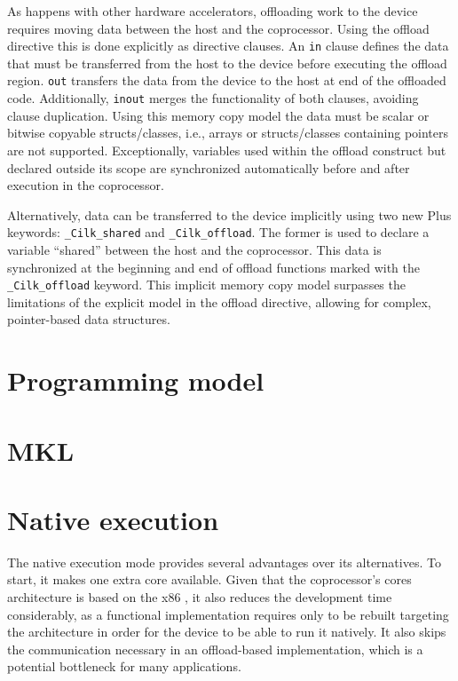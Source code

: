 \documentclass[../thesis]{subfiles}
\begin{document}
	As happens with other hardware accelerators, offloading work to the device requires moving data between the host and the coprocessor. Using the offload directive this is done explicitly as directive clauses. An \texttt{in} clause defines the data that must be transferred from the host to the device before executing the offload region. \texttt{out} transfers the data from the device to the host at end of the offloaded code. Additionally, \texttt{inout} merges the functionality of both clauses, avoiding clause duplication. Using this memory copy model the data must be scalar or bitwise copyable structs/classes, i.e., arrays or structs/classes containing pointers are not supported. Exceptionally, variables used within the offload construct but declared outside its scope are synchronized automatically before and after execution in the coprocessor.

	Alternatively, data can be transferred to the device implicitly using two new \intel\cilk Plus keywords: \texttt{\_Cilk\_shared} and \texttt{\_Cilk\_offload}. The former is used to declare a variable ``shared'' between the host and the coprocessor. This data is synchronized at the beginning and end of offload functions marked with the \texttt{\_Cilk\_offload} keyword. This implicit memory copy model surpasses the limitations of the explicit model in the offload directive, allowing for complex, pointer-based data structures.

	\section{Programming model}
	\section{MKL}

	\section{Native execution}
	The native execution mode provides several advantages over its alternatives. To start, it makes one extra core available. Given that the coprocessor's cores architecture is based on the x86 \isa, it also reduces the development time considerably, as a \cpu functional implementation requires only to be rebuilt targeting the \mic architecture in order for the device to be able to run it natively. It also skips the communication necessary in an offload-based implementation, which is a potential bottleneck for many applications.
\end{document}
